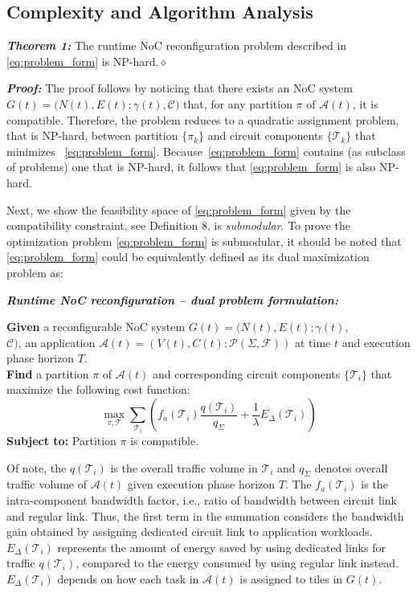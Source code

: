 {{\subsection{Complexity and Algorithm Analysis}

\noindent\textbf{\textit{Theorem 1:}} The runtime NoC reconfiguration problem described in \eqref{eq:problem_form} is NP-hard.\hfill $\diamond$

\noindent\textbf{\textit{Proof:}} The proof follows by noticing that there exists an NoC system $G(t)=(N(t),E(t);\gamma(t),$$\mathcal C)$ that, for any partition $\pi$ of $\mathcal A(t)$, it is compatible. Therefore, the problem reduces to a quadratic assignment problem, that is NP-hard, between partition $\{\pi_k\}$ and circuit components $\{\mathcal T_{k}\}$ that minimizes ~\eqref{eq:problem_form}. Because~\eqref{eq:problem_form} contains (as subclass of problems) one that is NP-hard, it follows that \eqref{eq:problem_form} is also NP-hard.

Next, we show the feasibility space of \eqref{eq:problem_form} given by the compatibility constraint, see Definition 8,  is \textit{submodular}. To prove the optimization problem  \eqref{eq:problem_form} is submodular, it should be noted that \eqref{eq:problem_form} could be equivalently defined as its dual maximization problem as:

\noindent\textbf{\textit{Runtime NoC reconfiguration -- dual problem formulation:}}

\noindent\textbf{Given} a reconfigurable NoC system $G(t)=(N(t),E(t);\gamma(t),$\\$\mathcal C)$, an application $\mathcal A(t)=(V(t),C(t);\mathcal P(\Sigma,\mathcal F))$ at time $t$ and execution phase horizon $T$.\\
\noindent\textbf{Find} a  partition $\pi$ of $\mathcal A(t) $ and corresponding circuit components $\{ \mathcal T_{i}\}$ that maximize the following cost function:
\begin{equation}\label{eq:problem_form_2}
\max\limits_{\pi,\mathcal T} \sum_{\mathcal T_{i}}( f_{a}(\mathcal T_{i})\frac{q(\mathcal T_{i})}{q_{\Sigma}}+ \frac{1}{\lambda} E_{\Delta}(\mathcal T_{i}) )
\end{equation}
\noindent\textbf{Subject to:} Partition $\pi$ is compatible.

Of note, the $q(\mathcal T_{i})$ is the overall traffic volume in $\mathcal T_{i}$ and $q_{\Sigma}$ denotes overall traffic volume of $\mathcal A(t)$ given execution phase horizon $T$. The $f_{a}(\mathcal T_{i})$ is the intra-component bandwidth factor, i.e., ratio of bandwidth between circuit link and regular link. Thus, the first term in the summation considers the bandwidth gain obtained by assigning dedicated circuit link to application workloads. $E_{\Delta}(\mathcal T_{i})$ represents the amount of energy saved by using dedicated links for traffic $q(\mathcal T_{i})$, compared to the energy consumed by using regular link instead. $E_{\Delta}(\mathcal T_{i})$ depends on how each task in $\mathcal A(t)$ is assigned to tiles in $G(t)$.

}}
